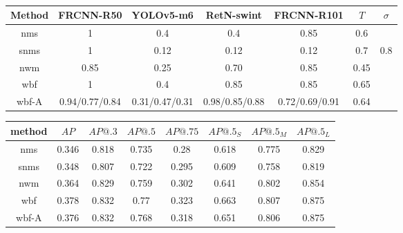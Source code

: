 

\begin{table}[h]
    \begin{tabular}{|c|c|c|c|c|c|c|}
        \hline
        Method & FRCNN-R50      & YOLOv5-m6      & RetN-swint     & FRCNN-R101     & $T$  & $\sigma$ \\ \hline
        nms    & 1              & 0.4            & 0.4            & 0.85           & 0.6  &          \\ \hline
        snms   & 1              & 0.12           & 0.12           & 0.12           & 0.7  & 0.8      \\ \hline
        nwm    & 0.85           & 0.25           & 0.70           & 0.85           & 0.45 &          \\ \hline
        wbf    & 1              & 0.4            & 0.85           & 0.85           & 0.65 &          \\ \hline
        wbf-A  & 0.94/0.77/0.84 & 0.31/0.47/0.31 & 0.98/0.85/0.88 & 0.72/0.69/0.91 & 0.64 &          \\ \hline
    \end{tabular}
    \caption{}
\end{table}


\begin{table}[h]
    \centering
    \begin{tabular}{|c|c|c|c|c|c|c|c|}
        \hline
        method & $AP$  & $AP@.3$ & $AP@.5$ & $AP@.75$ & $AP@.5_S$ & $AP@.5_M$ & $AP@.5_L$ \\ \hline
        nms    & 0.346 & 0.818   & 0.735   & 0.28     & 0.618     & 0.775     & 0.829     \\ \hline
        snms   & 0.348 & 0.807   & 0.722   & 0.295    & 0.609     & 0.758     & 0.819     \\ \hline
        nwm    & 0.364 & 0.829   & 0.759   & 0.302    & 0.641     & 0.802     & 0.854     \\ \hline
        wbf    & 0.378 & 0.832   & 0.77    & 0.323    & 0.663     & 0.807     & 0.875     \\ \hline
        wbf-A  & 0.376 & 0.832   & 0.768   & 0.318    & 0.651     & 0.806     & 0.875     \\ \hline
    \end{tabular}
\end{table}


